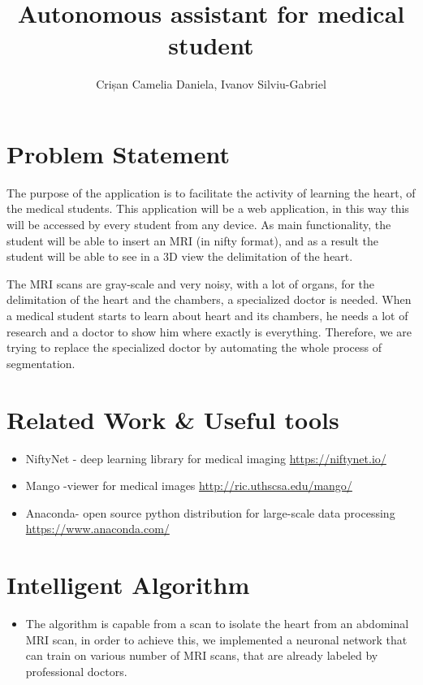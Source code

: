 \documentclass{report}
\title{Autonomous assistant for medical student}
\author{Crișan Camelia Daniela, Ivanov Silviu-Gabriel}
\begin{document}
\maketitle

\section*{Problem Statement}
 The purpose of the application is to facilitate the activity of learning the heart, of the medical students. This application will be a web application, in this way this will be accessed by every student from any device. As main functionality, the student will be able to insert an MRI (in nifty format), and as a result the student will be able to see in a 3D view the delimitation of the heart. \par
The MRI scans are gray-scale and very noisy, with a lot of organs, for the delimitation of the heart and the chambers, a specialized doctor is needed. When a medical student starts to learn about heart and its chambers, he needs a lot of research and a doctor to show him where exactly is everything. Therefore, we are trying to replace the specialized doctor by automating the whole process of segmentation.
\section*{Related Work \& Useful tools}
\begin{itemize}
\item NiftyNet - deep learning library for medical imaging \url{https://niftynet.io/}
\item Mango -viewer for medical images \url{http://ric.uthscsa.edu/mango/}
\item Anaconda- open source python distribution for large-scale data processing  \url{https://www.anaconda.com/}
\end{itemize}
\section*{Intelligent Algorithm}
\begin{itemize}
    \item The algorithm is capable from a scan to isolate the heart from an abdominal MRI scan, in order to achieve this, we implemented a neuronal network that can train on various number of MRI scans, that are already labeled by professional doctors.
\end{itemize}
\end{document}
